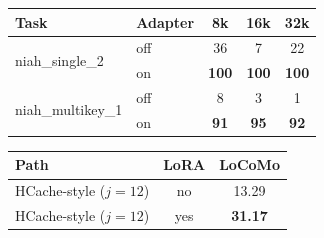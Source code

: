 \begin{table}[!t]
\centering
\small
\begin{minipage}[t]{0.61\textwidth}
\centering
\setlength{\tabcolsep}{4pt}
\begin{tabular}{@{}llccc@{}}
\toprule
\textbf{Task} & \textbf{Adapter} & \textbf{8k} & \textbf{16k} & \textbf{32k} \\
\midrule
\multirow{2}{*}{niah\_single\_2}
  & off & 36 & 7 & 22 \\
  & on  & \textbf{100} & \textbf{100} & \textbf{100} \\
\midrule
\multirow{2}{*}{niah\_multikey\_1}
  & off & 8 & 3 & 1 \\
  & on  & \textbf{91} & \textbf{95} & \textbf{92} \\
\bottomrule
\end{tabular}
\label{tab:adapter}
\end{minipage}
\hfill
\begin{minipage}[t]{0.35\textwidth}
\centering
\setlength{\tabcolsep}{5pt}
\begin{tabular}{@{}lcc@{}}
\toprule
\textbf{Path} & \textbf{LoRA} & \textbf{LoCoMo} \\
\midrule
HCache-style ($j{=}12$) & no  & 13.29 \\
HCache-style ($j{=}12$) & yes & \textbf{31.17} \\
\bottomrule
\end{tabular}
\label{tab:hcache-lora}
\end{minipage}
\end{table}
